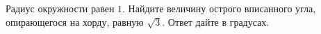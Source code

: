 \begin{ex}
	\begin{condition}
		 Радиус окружности равен \( 1 \). Найдите величину острого вписанного угла, опирающегося на хорду, равную \( \sqrt{3} \). Ответ дайте в градусах.
	\end{condition}
\end{ex}